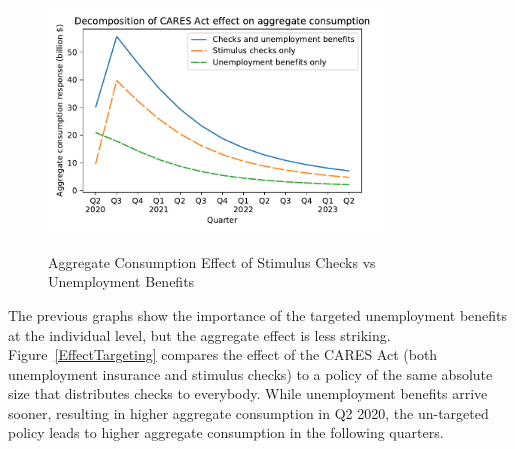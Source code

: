 \documentclass[titlepage,a4paper]{\econtex}
\begin{document}
\begin{figure}
  \centering
  \caption{Aggregate Consumption Effect of Stimulus Checks vs Unemployment Benefits}
  \label{checks_vs_unemp}
  { \includegraphics[width=0.8\textwidth]{./Figures/Checks_vs_Unemp}}
\end{figure}

The previous graphs show the importance of the targeted unemployment benefits at the individual level, but the aggregate effect is less striking.
Figure~\ref{EffectTargeting} compares the effect of the CARES Act (both unemployment insurance and stimulus checks) to a policy of the same absolute size that distributes checks to everybody.
While unemployment benefits arrive sooner, resulting in higher aggregate consumption in Q2 2020, the un-targeted policy leads to higher aggregate consumption in the following quarters.
\end{document}
